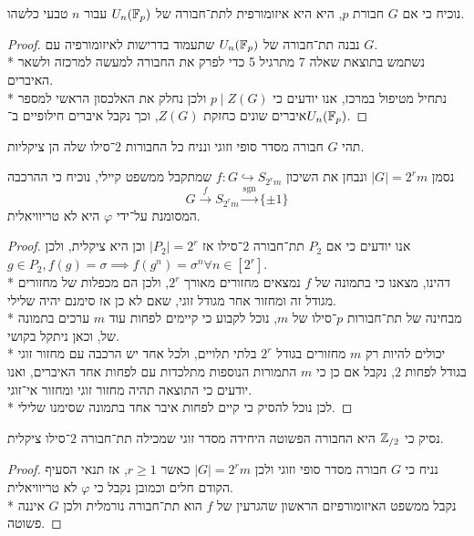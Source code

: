 \Subquestion{}
נוכיח כי אם $G$ חבורת $p$, היא היא איזומורפית לתת־חבורה של $U_n(\mathbb{F}_p)$ עבור $n$ טבעי כלשהו.
\begin{proof}
	נבנה תת־חבורה של $U_n(\mathbb{F}_p)$ שתעמוד בדרישות לאיזומורפיה עם $G$. \\*
	נשתמש בתוצאת שאלה 7 מתרגיל 5 כדי לפרק את החבורה למעשה למרכזה ולשאר האיברים. \\*
	נתחיל מטיפול במרכז, אנו יודעים כי $p \mid Z(G)$ ולכן נחלק את האלכסון הראשי למספר איברים שונים כחזקת $Z(G)$, וכך נקבל איברים חילופיים ב־$U_n(\mathbb{F}_p)$.
\end{proof}

\Question{}
תהי $G$ חבורה מסדר סופי וזוגי ונניח כל החבורות $2$־סילו שלה הן ציקליות.

\Subquestion{}
נסמן $|G| = 2^r m$ ונבחן את השיכון $f : G \hookrightarrow S_{2^r m}$ שמתקבל ממשפט קיילי, נוכיח כי ההרכבה
\[
	G \xrightarrow{f} S_{2^r m} \xrightarrow{\text{sgn}} \{\pm 1\}
\]
המסומנת על־ידי $\varphi$ היא לא טריוויאלית.
\begin{proof}
	אנו יודעים כי אם $P_2$ תת־חבורה $2$־סילו אז $|P_2| = 2^r$ וכן היא ציקלית, ולכן $g \in P_2, f(g) = \sigma \implies f(g^n) = \sigma^n \forall n \in [2^r]$. \\*
	דהינו, מצאנו כי בתמונה של $f$ נמצאים מחזורים מאורך $2^r$, ולכן הם מכפלות של מחזורים מגודל זה ומחזור אחר מגודל זוגי, שאם לא כן אז סימנם יהיה שלילי. \\*
	מבחינה של תת־חבורות $p$־סילו של $m$, נוכל לקבוע כי קיימים לפחות עוד $m$ ערכים בתמונה של, וכאן ניתקל בקושי. \\*
	יכולים להיות רק $m$ מחזורים בגודל $2^r$ בלתי תלויים, ולכל אחד יש הרכבה עם מחזור זוגי בגודל לפחות $2$, נקבל אם כן כי $m$ התמורות הנוספות מתלכדות עם לפחות אחד האיברים, ואנו יודעים כי התוצאה תהיה מחזור זוגי ומחזור אי־זוגי. \\*
	לכן נוכל להסיק כי קיים לפחות איבר אחד בתמונה שסימנו שלילי.
\end{proof}

\Subquestion{}
נסיק כי $\mathbb{Z}_{/2}$ היא החבורה הפשוטה היחידה מסדר זוגי שמכילה תת־חבורה $2$־סילו ציקלית.
\begin{proof}
	נניח כי $G$ חבורה מסדר סופי וזוגי ולכן $|G| = 2^r m$ כאשר $r \ge 1$, אז תנאי הסעיף הקודם חלים וכמובן נקבל כי $\varphi$ לא טריוויאלית. \\*
	נקבל ממשפט האיזומורפיזם הראשון שהגרעין של $f$ הוא תת־חבורה נורמלית ולכן $G$ איננה פשוטה.
\end{proof}


